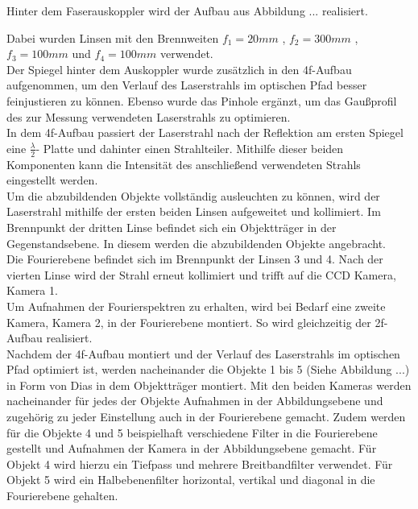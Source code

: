 

Hinter dem Faserauskoppler wird der Aufbau aus Abbildung ... realisiert.
 \begin{comment} Abbildung und Nummerierung noch ergänzen!!! \end{comment} 
Dabei wurden Linsen mit den Brennweiten $f_{1}=20mm$ , $f_{2}=300mm$ , $f_{3}=100mm$ und $f_{4}=100mm$ verwendet. \\
Der Spiegel hinter dem Auskoppler wurde zusätzlich in den 4f-Aufbau aufgenommen, um den Verlauf des Laserstrahls im optischen Pfad besser feinjustieren zu können. Ebenso wurde das Pinhole ergänzt, um das Gaußprofil des zur Messung verwendeten Laserstrahls zu optimieren. \\

In dem 4f-Aufbau passiert der Laserstrahl nach der Reflektion am ersten Spiegel eine $\frac{\lambda}{2}$- Platte und dahinter einen Strahlteiler. Mithilfe dieser beiden Komponenten kann die Intensität des anschließend verwendeten Strahls eingestellt werden. \\
Um die abzubildenden Objekte vollständig ausleuchten zu können, wird der Laserstrahl mithilfe der ersten beiden Linsen aufgeweitet und kollimiert. Im Brennpunkt der dritten Linse befindet sich ein Objektträger in der Gegenstandsebene. In diesem werden die abzubildenden Objekte angebracht. \\
Die Fourierebene befindet sich im Brennpunkt der Linsen 3 und 4. Nach der vierten Linse wird der Strahl erneut kollimiert und trifft auf die CCD Kamera, Kamera 1. \\
Um Aufnahmen der Fourierspektren zu erhalten, wird bei Bedarf eine zweite Kamera, Kamera 2, in der Fourierebene montiert. So wird gleichzeitig der 2f-Aufbau realisiert. \\ 

Nachdem der 4f-Aufbau montiert und der Verlauf des Laserstrahls im optischen Pfad optimiert ist, werden nacheinander die Objekte 1 bis 5 (Siehe Abbildung ...) in Form von Dias in dem Objektträger montiert. Mit den beiden Kameras werden nacheinander für jedes der Objekte Aufnahmen in der Abbildungsebene und zugehörig zu jeder Einstellung auch in der Fourierebene gemacht. Zudem werden für die Objekte 4 und 5 beispielhaft verschiedene Filter in die Fourierebene gestellt und Aufnahmen der Kamera in der Abbildungsebene gemacht. Für Objekt 4 wird hierzu ein Tiefpass und mehrere Breitbandfilter verwendet. Für Objekt 5 wird ein Halbebenenfilter horizontal, vertikal und diagonal in die Fourierebene gehalten. \\

